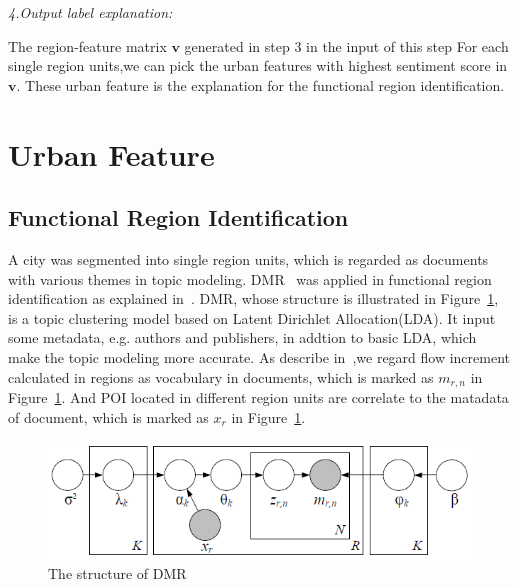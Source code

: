 \documentclass[runningheads]{llncs}
\begin{document}
\emph{4.Output label explanation:}

The region-feature matrix $\bm{v}$ generated in step 3 in the input of this step
For each single region units,we can pick the urban features with highest sentiment score in $\bm{v}$.
These urban feature is the explanation for the functional region identification.




















\section{Urban Feature}
\subsection{Functional Region Identification}
A city was segmented into single region units, which is regarded as documents with various themes in topic modeling.
DMR~\cite{Mimno2012DMR} was applied in functional region identification as explained in~\cite{Yuan2012FunctionRegion}.
DMR, whose structure is illustrated in Figure~\ref{DMR_ori}, is a topic clustering model based on Latent Dirichlet Allocation(LDA).
It input some metadata, e.g. authors and publishers, in addtion to basic LDA, which make the topic modeling more accurate.
As describe in~\cite{Yuan2012FunctionRegion},we regard flow increment calculated in regions as vocabulary in documents, which is marked as $m_{r,n}$ in Figure~\ref{DMR_ori}.
And POI located in different region units are correlate to the matadata of document, which is marked as $x_r$ in Figure~\ref{DMR_ori}.
\begin{figure}[h]
  \centering
  \includegraphics[scale=0.4]{DMR.png}
  \caption{The structure of DMR}
  \label{DMR_ori}
\end{figure}
\end{document}
